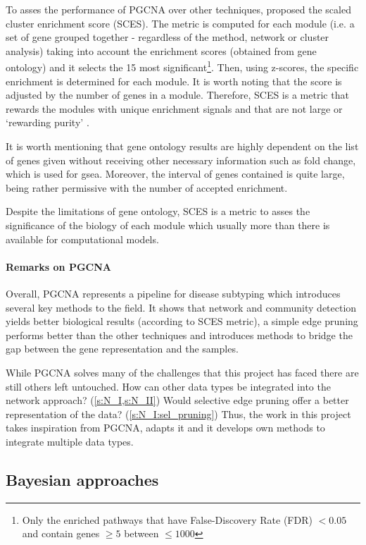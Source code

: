 To asses the performance of PGCNA over other techniques, \citet{Care2019-ij} proposed the scaled cluster enrichment score (SCES). The metric is computed for each module (i.e. a set of gene grouped together - regardless of the method, network or cluster analysis) taking into account the enrichment scores (obtained from gene ontology) and it selects the 15 most significant\footnote{Only the enriched pathways that have False-Discovery Rate (FDR) $<0.05$ and contain genes $\geq5$ between $\leq1000$}. Then, using z-scores, the specific enrichment is determined for each module. It is worth noting that the score is adjusted by the number of genes in a module. Therefore, SCES is a metric that rewards the modules with unique enrichment signals and that are not large or ‘rewarding purity' \citep{Care2019-ij}.

It is worth mentioning that gene ontology results are highly dependent on the list of genes given without receiving other necessary information such as fold change, which is used for \acrlong{gsea}. Moreover, the interval of genes contained is quite large, being rather permissive with the number of accepted enrichment.

Despite the limitations of gene ontology, SCES is a metric to asses the significance of the biology of each module which usually more than there is available for computational models.


\paragraph*{Remarks on PGCNA}

Overall, PGCNA represents a pipeline for disease subtyping which introduces several key methods to the field. It shows that network and community detection yields better biological results (according to SCES metric), a simple edge pruning performs better than the other techniques and introduces methods to bridge the gap between the gene representation and the samples.

While PGCNA solves many of the challenges that this project has faced there are still others left untouched. How can other data types be integrated into the network approach? (\cref{s:N_I,s:N_II}) Would selective edge pruning offer a better representation of the data? (\cref{s:N_I:sel_pruning}) Thus, the work in this project takes inspiration from PGCNA, adapts it and it develops own methods to integrate multiple data types.

\subsection{Bayesian approaches} \label{s:lit:bayesian}

